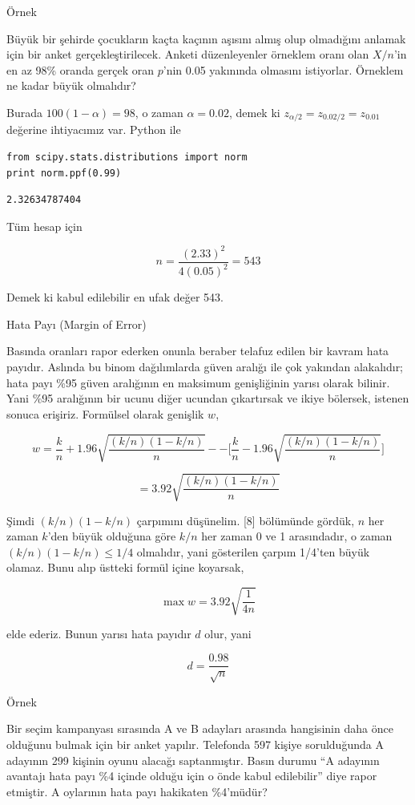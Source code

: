 \documentclass[12pt,fleqn]{article}\usepackage{../../common}
\begin{document}
Örnek

Büyük bir şehirde çocukların kaçta kaçının aşısını almış olup olmadığını
anlamak için bir anket gerçekleştirilecek. Anketi düzenleyenler örneklem
oranı olan $X/n$'in en az 98\% oranda gerçek oran $p$'nin 0.05 yakınında
olmasını istiyorlar. Örneklem ne kadar büyük olmalıdır? 

Burada $100(1-\alpha) = 98$, o zaman $\alpha = 0.02$, demek ki $z_{\alpha/2}
= z_{0.02/2} = z_{0.01}$ değerine ihtiyacımız var. Python ile

\begin{verbatim}
from scipy.stats.distributions import norm
print norm.ppf(0.99)
\end{verbatim}

\begin{verbatim}
2.32634787404
\end{verbatim}

Tüm hesap için

$$ n = \frac{(2.33)^2}{4(0.05)^2} = 543$$

Demek ki kabul edilebilir en ufak değer 543. 

Hata Payı (Margin of Error)

Basında oranları rapor ederken onunla beraber telafuz edilen bir kavram
hata payıdır. Aslında bu binom dağılımlarda güven aralığı ile çok yakından
alakalıdır;  hata payı \%95 güven aralığının en maksimum genişliğinin yarısı
olarak bilinir. Yani \%95 aralığının bir ucunu diğer ucundan çıkartırsak ve
ikiye bölersek, istenen sonuca erişiriz. Formülsel olarak genişlik $w$,

$$ w = \frac{k}{n} + 
1.96 \sqrt{\frac{(k/n)(1-k/n)}{n}} - 
- \bigg[ 
\frac{k}{n} -
1.96 \sqrt{\frac{(k/n)(1-k/n)}{n}}
\bigg]
 $$

$$ = 3.92 \sqrt{\frac{(k/n)(1-k/n)}{n}} $$

Şimdi $(k/n)(1-k/n)$ çarpımını düşünelim. [8] bölümünde gördük, $n$ her
zaman $k$'den büyük olduğuna göre $k/n$ her zaman 0 ve 1 arasındadır, o
zaman $(k/n)(1-k/n) \le 1/4$ olmalıdır, yani gösterilen çarpım 1/4'ten
büyük olamaz. Bunu alıp üstteki formül içine koyarsak,

$$ \max w = 3.92 \sqrt{\frac{1}{4n}} $$

elde ederiz. Bunun yarısı hata payıdır $d$ olur, yani

$$ d = \frac{0.98}{\sqrt{n}} $$

Örnek

Bir seçim kampanyası sırasında A ve B adayları arasında hangisinin daha
önce olduğunu bulmak için bir anket yapılır. Telefonda 597 kişiye
sorulduğunda A adayının 299 kişinin oyunu alacağı saptanmıştır. Basın
durumu ``A adayının avantajı hata payı \%4 içinde olduğu için o önde kabul
edilebilir'' diye rapor etmiştir. A oylarının hata payı hakikaten
\%4'müdür?
\end{document}
